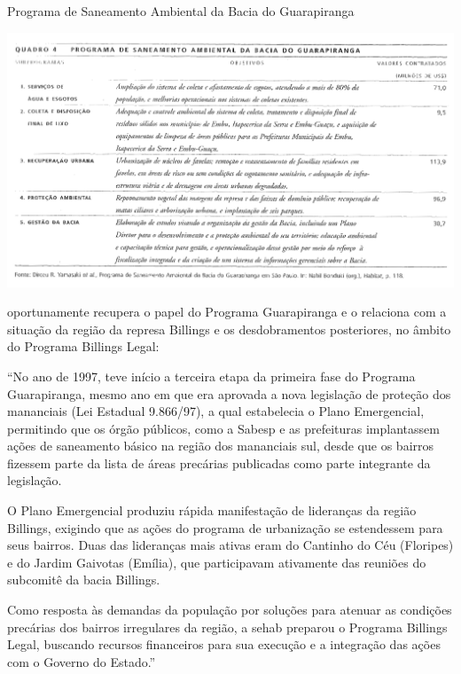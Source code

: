 	\begin{table}[htb]
		\centering
		\caption{Programa de Saneamento Ambiental da Bacia do Guarapiranga}
		\includegraphics[width=\linewidth]{img/francca_p029_tabela_programa}
		\label{tab:francca_programa}
	\end{table}
	
	 oportunamente recupera o papel do Programa Guarapiranga e o relaciona com a situação da região da represa Billings e os desdobramentos posteriores, no âmbito do Programa Billings Legal:
	
	\begin{citacao}
		``No ano de 1997, teve início a terceira etapa da primeira fase do Programa Guarapiranga, mesmo ano em que era aprovada a nova legislação de proteção dos mananciais (Lei Estadual 9.866/97), a qual estabelecia o Plano Emergencial, permitindo que os órgão públicos, como a Sabesp e as prefeituras implantassem ações de saneamento básico na região dos mananciais sul, desde que os bairros fizessem parte da lista de áreas precárias publicadas como parte integrante da legislação.
		
		O Plano Emergencial produziu rápida manifestação de lideranças da região Billings, exigindo que as ações do programa de urbanização se estendessem para seus bairros. Duas das lideranças mais ativas eram do Cantinho do Céu (Floripes) e do Jardim Gaivotas (Emília), que participavam ativamente das reuniões do subcomitê da bacia Billings.
		
		Como resposta às demandas da população por soluções para atenuar as condições precárias dos bairros irregulares da região, a \gls{sehab} preparou o Programa Billings Legal, buscando recursos financeiros para sua execução e a integração das ações com o Governo do Estado.''
	\end{citacao}

